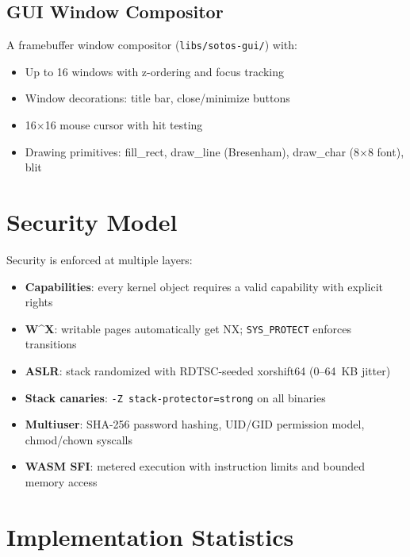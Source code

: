 \documentclass[11pt,letterpaper]{article}
\theoremstyle{definition}
\begin{document}
\subsection{GUI Window Compositor}

A framebuffer window compositor (\texttt{libs/sotos-gui/}) with:
\begin{itemize}[nosep]
    \item Up to 16 windows with z-ordering and focus tracking
    \item Window decorations: title bar, close/minimize buttons
    \item 16$\times$16 mouse cursor with hit testing
    \item Drawing primitives: fill\_rect, draw\_line (Bresenham), draw\_char (8$\times$8 font), blit
\end{itemize}

\section{Security Model}
\label{sec:security}

Security is enforced at multiple layers:
\begin{itemize}[nosep]
    \item \textbf{Capabilities}: every kernel object requires a valid capability with explicit rights
    \item \textbf{W\^{}X}: writable pages automatically get NX; \texttt{SYS\_PROTECT} enforces transitions
    \item \textbf{ASLR}: stack randomized with RDTSC-seeded xorshift64 (0--64~KB jitter)
    \item \textbf{Stack canaries}: \texttt{-Z stack-protector=strong} on all binaries
    \item \textbf{Multiuser}: SHA-256 password hashing, UID/GID permission model, chmod/chown syscalls
    \item \textbf{WASM SFI}: metered execution with instruction limits and bounded memory access
\end{itemize}

\section{Implementation Statistics}
\label{sec:stats}
\end{document}
